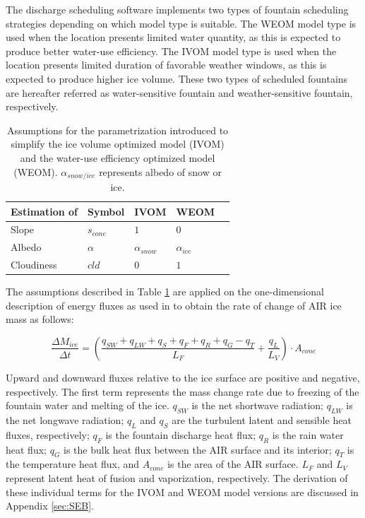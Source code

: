 \documentclass[tc, manuscript]{copernicus}
\begin{document}
The discharge scheduling software implements two types of fountain scheduling strategies depending on which
model type is suitable. The WEOM model type is used when the location presents limited water quantity, as this
is expected to produce better water-use efficiency. The IVOM model type is used when the location presents
limited duration of favorable weather windows, as this is expected to produce higher ice volume. These two types
of scheduled fountains are hereafter referred as water-sensitive fountain and weather-sensitive fountain,
respectively.

\begin{table}[htb]
\centering
\caption{Assumptions for the parametrization introduced to simplify the ice volume optimized model (IVOM) and the
water-use efficiency optimized model (WEOM). $\alpha_{snow/ice}$ represents albedo of snow or ice.}
\label{tab:assumptions}
\begin{tabular}{@{}lllll@{}}
\toprule
\textbf{Estimation of} & \textbf{Symbol} & \textbf{IVOM} & \textbf{WEOM} & \\ \midrule
\multicolumn{1}{|l}{Slope}        & $s_{cone}$ & $ 1 $ & $0$ & \multicolumn{1}{l|}{} \\ \midrule
\multicolumn{1}{|l}{Albedo} & $\alpha$ & $\alpha_{snow}$ & $\alpha_{ice}$ & \multicolumn{1}{l|}{} \\\midrule 
\multicolumn{1}{|l}{Cloudiness}  & $cld$ & $0$ & $1$ & \multicolumn{1}{l|}{} \\ \bottomrule
\end{tabular}
\end{table}

The assumptions described in Table \ref{tab:assumptions} are applied on the one-dimensional description of
energy fluxes as used in \cite{balasubramanianInfluenceMeteorologicalConditions2022} to obtain the rate of
change of AIR ice mass as follows: 

\begin{equation}
  \frac{\Delta M_{ice}}{\Delta t}  =  (\frac{q_{SW} + q_{LW} + q_{S} + q_{F} + q_{R} + q_{G} - q_{T}}{L_F} + \frac{q_{L}}{L_V} ) \cdot A_{cone}
	\label{eqn:auto}
\end{equation}

Upward and downward fluxes relative to the ice surface are positive and negative, respectively. The first term
represents the mass change rate due to freezing of the fountain water and melting of the ice. $q_{SW}$ is the
net shortwave radiation; $q_{LW}$ is the net longwave radiation; $q_{L}$ and $q_{S}$ are the turbulent latent
and sensible heat fluxes, respectively; $q_{F}$ is the fountain discharge heat flux; $q_{R}$ is the rain water
heat flux; $q_{G}$ is the bulk heat flux between the AIR surface and its interior; $q_{T}$ is the temperature
heat flux, and $A_{cone}$ is the area of the AIR surface. $L_F$ and $L_{V}$ represent latent heat of fusion and
vaporization, respectively. The derivation of these individual terms for the IVOM and WEOM model versions are
discussed in Appendix \ref{sec:SEB}.
\end{document}
